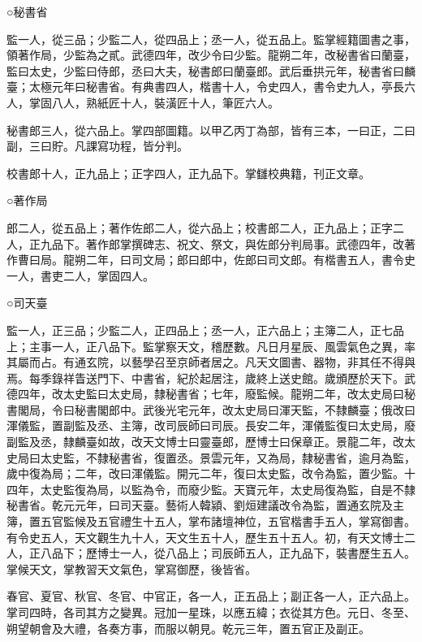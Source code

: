 \begin{pinyinscope}
 ○秘書省



 監一人，從三品；少監二人，從四品上；丞一人，從五品上。監掌經籍圖書之事，領著作局，少監為之貳。武德四年，改少令曰少監。龍朔二年，改秘書省曰蘭臺，監曰太史，少監曰侍郎，丞曰大夫，秘書郎曰蘭臺郎。武后垂拱元年，秘書省曰麟臺；太極元年曰秘書省。有典書四人，楷書十人，令史四人，書令史九人，亭長六人，掌固八人，熟紙匠十人，裝潢匠十人，筆匠六人。



 秘書郎三人，從六品上。掌四部圖籍。以甲乙丙丁為部，皆有三本，一曰正，二曰副，三曰貯。凡課寫功程，皆分判。



 校書郎十人，正九品上；正字四人，正九品下。掌讎校典籍，刊正文章。



 ○著作局



 郎二人，從五品上；著作佐郎二人，從六品上；校書郎二人，正九品上；正字二人，正九品下。著作郎掌撰碑志、祝文、祭文，與佐郎分判局事。武德四年，改著作曹曰局。龍朔二年，曰司文局；郎曰郎中，佐郎曰司文郎。有楷書五人，書令史一人，書吏二人，掌固四人。



 ○司天臺



 監一人，正三品；少監二人，正四品上；丞一人，正六品上；主簿二人，正七品上；主事一人，正八品下。監掌察天文，稽歷數。凡日月星辰、風雲氣色之異，率其屬而占。有通玄院，以藝學召至京師者居之。凡天文圖書、器物，非其任不得與焉。每季錄祥眚送門下、中書省，紀於起居注，歲終上送史館。歲頒歷於天下。武德四年，改太史監曰太史局，隸秘書省；七年，廢監候。龍朔二年，改太史局曰秘書閣局，令曰秘書閣郎中。武後光宅元年，改太史局曰渾天監，不隸麟臺；俄改曰渾儀監，置副監及丞、主簿，改司辰師曰司辰。長安二年，渾儀監復曰太史局，廢副監及丞，隸麟臺如故，改天文博士曰靈臺郎，歷博士曰保章正。景龍二年，改太史局曰太史監，不隸秘書省，復置丞。景雲元年，又為局，隸秘書省，逾月為監，歲中復為局；二年，改曰渾儀監。開元二年，復曰太史監，改令為監，置少監。十四年，太史監復為局，以監為令，而廢少監。天寶元年，太史局復為監，自是不隸秘書省。乾元元年，曰司天臺。藝術人韓潁、劉烜建議改令為監，置通玄院及主簿，置五官監候及五官禮生十五人，掌布諸壇神位，五官楷書手五人，掌寫御書。有令史五人，天文觀生九十人，天文生五十人，歷生五十五人。初，有天文博士二人，正八品下；歷博士一人，從八品上；司辰師五人，正九品下，裝書歷生五人。掌候天文，掌教習天文氣色，掌寫御歷，後皆省。



 春官、夏官、秋官、冬官、中官正，各一人，正五品上；副正各一人，正六品上。掌司四時，各司其方之變異。冠加一星珠，以應五緯；衣從其方色。元日、冬至、朔望朝會及大禮，各奏方事，而服以朝見。乾元三年，置五官正及副正。




\end{pinyinscope}
